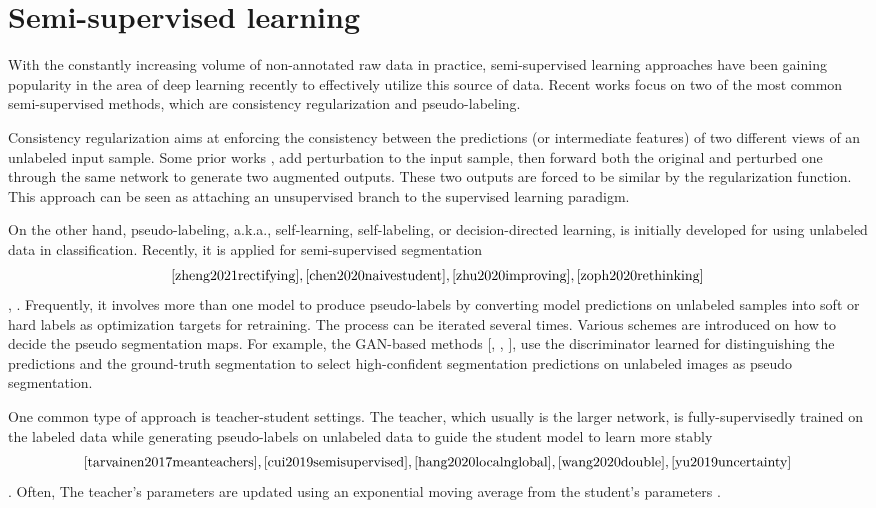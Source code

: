 \section{Semi-supervised learning}
\label{sec:semisup}

With the constantly increasing volume of non-annotated raw data in practice, semi-supervised learning approaches have been gaining popularity in the area of deep learning recently to effectively utilize this source of data.  
Recent works focus on two of the most common semi-supervised methods, which are consistency regularization and pseudo-labeling.

Consistency regularization aims at enforcing the consistency between the predictions (or intermediate features) of two different views of an unlabeled input sample. 
Some prior works \cite{kim2020structuredloss}, \cite{french2019semi} add perturbation to the input sample, then forward both the original and perturbed one through the same network to generate two augmented outputs. These two outputs are forced to be similar by the regularization function. This approach can be seen as attaching an unsupervised branch to the supervised learning paradigm.

On the other hand, pseudo-labeling, a.k.a., self-learning, self-labeling, or decision-directed learning, is initially developed for using unlabeled data in classification. Recently, it is applied for semi-supervised segmentation \[\cite{zheng2021rectifying}, \cite{chen2020naivestudent}, \cite{zhu2020improving}, \cite{zoph2020rethinking} \], . Frequently, it involves more than one model to produce pseudo-labels by converting model predictions on unlabeled samples into soft or hard labels as optimization targets for retraining. The process can be iterated several times. Various schemes are introduced on how to decide the pseudo segmentation maps. For example, the GAN-based methods [\cite{hung2018adversarial}, \cite{mittal2019semi}, \cite{souly2017semisupervised}], use the discriminator learned for distinguishing the predictions and the ground-truth segmentation to select high-confident segmentation predictions on unlabeled images as pseudo segmentation.

One common type of approach is teacher-student settings. The teacher, which usually is the larger network, is fully-supervisedly trained on the labeled data while generating pseudo-labels on unlabeled data to guide the student model to learn more stably \[\cite{tarvainen2017meanteachers}, \cite{cui2019semisupervised}, \cite{hang2020localnglobal}, \cite{wang2020double}, \cite{yu2019uncertainty}\]. Often, The teacher's parameters are updated using an exponential moving average from the student's parameters \cite{cui2019semisupervised}. 

